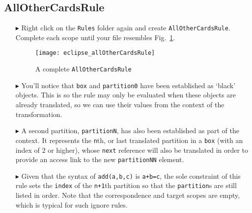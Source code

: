 \newpage
\hypertarget{allCards tex}{}
\subsection{AllOtherCardsRule}
\texHeader

\begin{itemize}

\item[$\blacktriangleright$] Right click on the \texttt{Rules} folder again and create \texttt{AllOtherCardsRule}. Complete each scope until your file resembles
Fig.~\ref{eclipse:allOtherCardsRuleComplete}.

\vspace{0.5cm}

\begin{figure}[htbp]
\begin{center}
  \texttt{[image: eclipse\_allOtherCardsRule]}
  \caption{A complete \texttt{AllOtherCardsRule}}
  \label{eclipse:allOtherCardsRuleComplete}
\end{center}
\end{figure}

\item[$\blacktriangleright$] You'll notice that \texttt{box} and \texttt{partition0} have been established as `black' objects. This is so the rule may only be
evaluated when these objects are already translated, so we can use their values from the context of the transformation.

\vspace{0.5cm}

\item[$\blacktriangleright$] A second partition, \texttt{partitionN}, has also been established as part of the context. It represents the \texttt{n}th, or last
translated partition in a \texttt{box} (with an index of 2 or higher), whose \texttt{next} reference will also be translated in order to provide an access
link to the new \texttt{partitionNN} element.

\newpage

\item[$\blacktriangleright$] Given that the syntax of \texttt{add(a,b,c)} is \texttt{a+b=c}, the sole constraint of this rule sets the \texttt{index}
of the \texttt{n+1}th partition so that the \texttt{partition}s are still listed in order. Note that the correspondence and target scopes are empty, which is typical
for such ignore rules.

\vspace{0.5cm}


\end{itemize}
